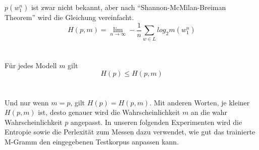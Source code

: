 \\
\\
$p(w_{1}^{n})$ ist zwar nicht bekannt, aber nach "`Shannon-McMilan-Breiman Theorem"' wird die Gleichung vereinfacht. 
\begin{equation}
H(p,m)=\lim_{n\to\infty}-\frac{1}{n}\sum_{w\in L}log_{2}m(w_{1}^{n})
\end{equation}
\\
\\
F\"ur jedes Modell $m$ gilt \\
\begin{equation}
H(p)\leq H(p,m)
\end{equation}
\\
\\
Und nur wenn $m=p$, gilt $H(p)=H(p,m)$. Mit anderen Worten, je kleiner $H(p,m)$ ist, desto genauer wird die Wahrscheinlichkeit $m$ an die wahr Wahrscheinlichkeit $p$ angepasst.
In unseren folgenden Experimenten wird die Entropie sowie die Perlexit\"at zum Messen dazu verwendet, wie gut das trainierte M-Gramm den eingegebenen Testkorpus anpassen kann.

